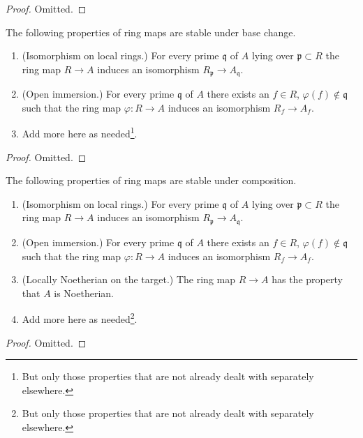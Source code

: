 \begin{proof}
Omitted.
\end{proof}

\begin{lemma}
\label{lemma-properties-base-change}
The following properties of ring maps are stable under base change.
\begin{enumerate}
\item (Isomorphism on local rings.)
For every prime $\mathfrak q$ of $A$ lying over $\mathfrak p \subset R$
the ring map $R \to A$ induces an isomorphism
$R_{\mathfrak p} \to A_{\mathfrak q}$.
\item (Open immersion.)
For every prime $\mathfrak q$ of $A$ there exists an $f \in R$,
$\varphi(f) \not \in \mathfrak q$ such that the ring map $\varphi : R \to A$
induces an isomorphism $R_f \to A_f$.
\item Add more here as needed\footnote{But only those properties
that are not already dealt with separately elsewhere.}.
\end{enumerate}
\end{lemma}

\begin{proof}
Omitted.
\end{proof}

\begin{lemma}
\label{lemma-properties-composition}
The following properties of ring maps are stable under composition.
\begin{enumerate}
\item (Isomorphism on local rings.)
For every prime $\mathfrak q$ of $A$ lying over $\mathfrak p \subset R$
the ring map $R \to A$ induces an isomorphism
$R_{\mathfrak p} \to A_{\mathfrak q}$.
\item (Open immersion.)
For every prime $\mathfrak q$ of $A$ there exists an $f \in R$,
$\varphi(f) \not \in \mathfrak q$ such that the ring map $\varphi : R \to A$
induces an isomorphism $R_f \to A_f$.
\item (Locally Noetherian on the target.)
The ring map $R \to A$ has the property that $A$ is Noetherian.
\item Add more here as needed\footnote{But only those properties
that are not already dealt with separately elsewhere.}.
\end{enumerate}
\end{lemma}

\begin{proof}
Omitted.
\end{proof}








